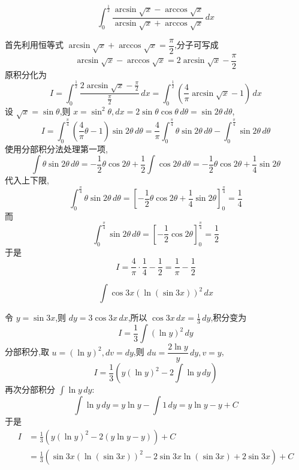 \begin{questions}
    \question
    \[
    \int_{0}^{\frac{1}{2}} \frac{\arcsin\sqrt{x}-\arccos\sqrt{x}}{\arcsin\sqrt{x}+\arccos\sqrt{x}} \,dx 
    \]
    \begin{solution}
        首先利用恒等式 $\arcsin\sqrt{x} + \arccos\sqrt{x} = \dfrac{\pi}{2}$,分子可写成
        \[
        \arcsin\sqrt{x} - \arccos\sqrt{x} = 2\arcsin\sqrt{x} - \frac{\pi}{2}
        \]
        原积分化为
        \[
        I = \int_{0}^{\frac{1}{2}} \frac{2\arcsin\sqrt{x} - \frac{\pi}{2}}{\frac{\pi}{2}} \,dx = \int_{0}^{\frac{1}{2}} \left( \frac{4}{\pi}\arcsin\sqrt{x} - 1 \right) \,dx
        \]
        设 $\sqrt{x} = \sin \theta$,则 $x = \sin^2 \theta,dx = 2\sin \theta \cos \theta \,d\theta = \sin 2\theta \,d\theta$,
        \[
        I = \int_{0}^{\frac{\pi}{4}} \left( \frac{4}{\pi}\theta - 1 \right) \sin 2\theta \,d\theta = \frac{4}{\pi} \int_{0}^{\frac{\pi}{4}} \theta \sin 2\theta \,d\theta - \int_{0}^{\frac{\pi}{4}} \sin 2\theta \,d\theta
        \]
        使用分部积分法处理第一项,
        \[
        \int \theta \sin 2\theta \,d\theta = -\frac{1}{2}\theta \cos 2\theta + \frac{1}{2} \int \cos 2\theta \, d\theta
        = -\frac{1}{2}\theta \cos 2\theta + \frac{1}{4}\sin 2\theta
        \]
        代入上下限,
        \[
        \int_{0}^{\frac{\pi}{4}} \theta \sin 2\theta \,d\theta = \left[ -\frac{1}{2} \theta \cos 2\theta + \frac{1}{4}\sin 2\theta \right]_{0}^{\frac{\pi}{4}}  = \frac{1}{4}
        \]
        而
        \[
        \int_{0}^{\frac{\pi}{4}} \sin 2\theta \,d\theta = \left[ -\frac{1}{2} \cos 2\theta \right]_{0}^{\frac{\pi}{4}} = \frac{1}{2}
        \]
        于是
        \[
        I = \frac{4}{\pi} \cdot \frac{1}{4} - \frac{1}{2} = \frac{1}{\pi} - \frac{1}{2}
        \]
    \end{solution}

    \question
    \[
    \int \cos 3x (\ln(\sin 3x))^2 \,dx
    \]
    \begin{solution}
        令 $y = \sin 3x$,则 $dy = 3\cos 3x \,dx$,所以 $\cos 3x \,dx = \frac{1}{3} \,dy$,积分变为
        \[
        I = \frac{1}{3} \int (\ln y)^2 \,dy
        \]
        分部积分,取 $u=(\ln y)^2, dv=dy$,则 $du = \dfrac{2\ln y}{y} \,dy, v=y$,
        \[
        I = \frac{1}{3} \left( y(\ln y)^2 - 2 \int \ln y \,dy \right)
        \]
        再次分部积分 $\int \ln y \,dy$:
        \[
        \int \ln y \,dy = y\ln y - \int 1 \,dy = y\ln y - y + C
        \]
        于是
        \begin{align*}
        I &= \frac{1}{3} \left( y(\ln y)^2 - 2(y\ln y - y) \right) +C \\
        &= \frac{1}{3} \left( \sin 3x(\ln (\sin 3x))^2 - 2\sin 3x\ln (\sin 3x) +2\sin 3x\right)+C
        \end{align*}
    \end{solution}


\end{questions}
